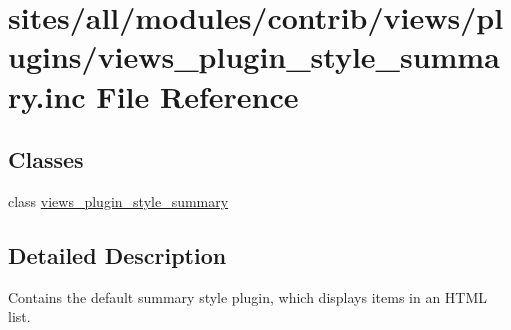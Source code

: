 \hypertarget{views__plugin__style__summary_8inc}{
\section{sites/all/modules/contrib/views/plugins/views\_\-plugin\_\-style\_\-summary.inc File Reference}
\label{views__plugin__style__summary_8inc}
}
\subsection*{Classes}
\begin{CompactItemize}
\item 
class \hyperlink{classviews__plugin__style__summary}{views\_\-plugin\_\-style\_\-summary}
\end{CompactItemize}


\subsection{Detailed Description}
Contains the default summary style plugin, which displays items in an HTML list. 